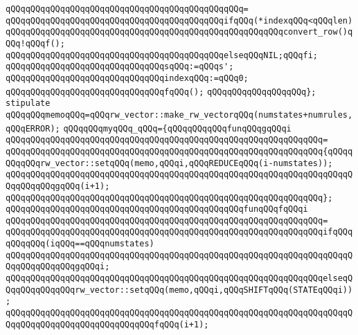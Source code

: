 \verb|qQQqqQQqqQQqqQQqqQQqqQQqqQQqqQQqqQQqqQQqqQQqqQQq=|\newline
\verb|qQQqqQQqqQQqqQQqqQQqqQQqqQQqqQQqqQQqqQQqqQQqifqQQq(*indexqQQq<qQQqlen)|\newline
\verb|qQQqqQQqqQQqqQQqqQQqqQQqqQQqqQQqqQQqqQQqqQQqqQQqqQQqqQQqconvert_row()qQQq!qQQqf();|\newline
\verb|qQQqqQQqqQQqqQQqqQQqqQQqqQQqqQQqqQQqqQQqqQQqelseqQQqNIL;qQQqfi;|\newline
\verb|qQQqqQQqqQQqqQQqqQQqqQQqqQQqqQQqsqQQq:=qQQqs';|\newline
\verb|qQQqqQQqqQQqqQQqqQQqqQQqqQQqqQQqindexqQQq:=qQQq0;|\newline
\verb|qQQqqQQqqQQqqQQqqQQqqQQqqQQqqQQqfqQQq();|\newline
\verb|qQQqqQQqqQQqqQQqqQQq};|\newline
\newline
\verb|stipulate|\newline
\verb|qQQqqQQqmemoqQQq=qQQqrw_vector::make_rw_vectorqQQq(numstates+numrules,qQQqERROR);|\newline
\verb|qQQqqQQqmyqQQq_qQQq={qQQqqQQqqQQqfunqQQqgqQQqi|\newline
\verb|qQQqqQQqqQQqqQQqqQQqqQQqqQQqqQQqqQQqqQQqqQQqqQQqqQQqqQQqqQQqqQQq=|\newline
\verb|qQQqqQQqqQQqqQQqqQQqqQQqqQQqqQQqqQQqqQQqqQQqqQQqqQQqqQQqqQQqqQQq{qQQqqQQqqQQqrw_vector::setqQQq(memo,qQQqi,qQQqREDUCEqQQq(i-numstates));|\newline
\verb|qQQqqQQqqQQqqQQqqQQqqQQqqQQqqQQqqQQqqQQqqQQqqQQqqQQqqQQqqQQqqQQqqQQqqQQqqQQqqQQqgqQQq(i+1);|\newline
\verb|qQQqqQQqqQQqqQQqqQQqqQQqqQQqqQQqqQQqqQQqqQQqqQQqqQQqqQQqqQQqqQQq};|\newline
\newline
\verb|qQQqqQQqqQQqqQQqqQQqqQQqqQQqqQQqqQQqqQQqqQQqqQQqfunqQQqfqQQqi|\newline
\verb|qQQqqQQqqQQqqQQqqQQqqQQqqQQqqQQqqQQqqQQqqQQqqQQqqQQqqQQqqQQqqQQq=|\newline
\verb|qQQqqQQqqQQqqQQqqQQqqQQqqQQqqQQqqQQqqQQqqQQqqQQqqQQqqQQqqQQqqQQqifqQQqqQQqqQQq(iqQQq==qQQqnumstates)|\newline
\verb|qQQqqQQqqQQqqQQqqQQqqQQqqQQqqQQqqQQqqQQqqQQqqQQqqQQqqQQqqQQqqQQqqQQqqQQqqQQqqQQqqQQqgqQQqi;|\newline
\verb|qQQqqQQqqQQqqQQqqQQqqQQqqQQqqQQqqQQqqQQqqQQqqQQqqQQqqQQqqQQqqQQqelseqQQqqQQqqQQqqQQqrw_vector::setqQQq(memo,qQQqi,qQQqSHIFTqQQq(STATEqQQqi));|\newline
\verb|qQQqqQQqqQQqqQQqqQQqqQQqqQQqqQQqqQQqqQQqqQQqqQQqqQQqqQQqqQQqqQQqqQQqqQQqqQQqqQQqqQQqqQQqqQQqqQQqqQQqfqQQq(i+1);|\newline
